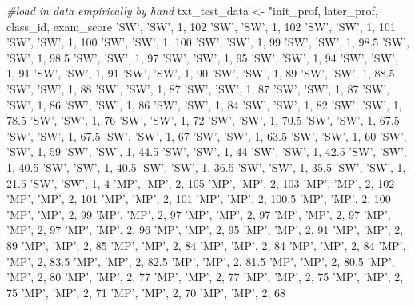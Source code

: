 \documentclass[
]{book}
\newenvironment{Shaded}{\begin{snugshade}}{\end{snugshade}}
\newcommand{\CommentTok}[1]{\textcolor[rgb]{0.56,0.35,0.01}{\textit{#1}}}
\newcommand{\NormalTok}[1]{#1}
\newcommand{\StringTok}[1]{\textcolor[rgb]{0.31,0.60,0.02}{#1}}
\begin{document}
\begin{Shaded}
\begin{Highlighting}[]
\CommentTok{#load in data empirically by hand}
\NormalTok{txt_test_data <-}\StringTok{ "init_prof, later_prof, class_id, exam_score}
\StringTok{ 'SW', 'SW', 1, 102}
\StringTok{ 'SW', 'SW', 1, 102}
\StringTok{ 'SW', 'SW', 1, 101}
\StringTok{ 'SW', 'SW', 1, 100}
\StringTok{ 'SW', 'SW', 1, 100}
\StringTok{ 'SW', 'SW', 1, 99}
\StringTok{ 'SW', 'SW', 1, 98.5}
\StringTok{ 'SW', 'SW', 1, 98.5}
\StringTok{ 'SW', 'SW', 1, 97}
\StringTok{ 'SW', 'SW', 1, 95}
\StringTok{ 'SW', 'SW', 1, 94}
\StringTok{ 'SW', 'SW', 1, 91}
\StringTok{ 'SW', 'SW', 1, 91}
\StringTok{ 'SW', 'SW', 1, 90}
\StringTok{ 'SW', 'SW', 1, 89}
\StringTok{ 'SW', 'SW', 1, 88.5}
\StringTok{ 'SW', 'SW', 1, 88}
\StringTok{ 'SW', 'SW', 1, 87}
\StringTok{ 'SW', 'SW', 1, 87}
\StringTok{ 'SW', 'SW', 1, 87}
\StringTok{ 'SW', 'SW', 1, 86}
\StringTok{ 'SW', 'SW', 1, 86}
\StringTok{ 'SW', 'SW', 1, 84}
\StringTok{ 'SW', 'SW', 1, 82}
\StringTok{ 'SW', 'SW', 1, 78.5}
\StringTok{ 'SW', 'SW', 1, 76}
\StringTok{ 'SW', 'SW', 1, 72}
\StringTok{ 'SW', 'SW', 1, 70.5}
\StringTok{ 'SW', 'SW', 1, 67.5}
\StringTok{ 'SW', 'SW', 1, 67.5}
\StringTok{ 'SW', 'SW', 1, 67}
\StringTok{ 'SW', 'SW', 1, 63.5}
\StringTok{ 'SW', 'SW', 1, 60}
\StringTok{ 'SW', 'SW', 1, 59}
\StringTok{ 'SW', 'SW', 1, 44.5}
\StringTok{ 'SW', 'SW', 1, 44}
\StringTok{ 'SW', 'SW', 1, 42.5}
\StringTok{ 'SW', 'SW', 1, 40.5}
\StringTok{ 'SW', 'SW', 1, 40.5}
\StringTok{ 'SW', 'SW', 1, 36.5}
\StringTok{ 'SW', 'SW', 1, 35.5}
\StringTok{ 'SW', 'SW', 1, 21.5}
\StringTok{ 'SW', 'SW', 1, 4}
\StringTok{ 'MP', 'MP', 2, 105}
\StringTok{ 'MP', 'MP', 2, 103}
\StringTok{ 'MP', 'MP', 2, 102}
\StringTok{ 'MP', 'MP', 2, 101}
\StringTok{ 'MP', 'MP', 2, 101}
\StringTok{ 'MP', 'MP', 2, 100.5}
\StringTok{ 'MP', 'MP', 2, 100}
\StringTok{ 'MP', 'MP', 2, 99}
\StringTok{ 'MP', 'MP', 2, 97}
\StringTok{ 'MP', 'MP', 2, 97}
\StringTok{ 'MP', 'MP', 2, 97}
\StringTok{ 'MP', 'MP', 2, 97}
\StringTok{ 'MP', 'MP', 2, 96}
\StringTok{ 'MP', 'MP', 2, 95}
\StringTok{ 'MP', 'MP', 2, 91}
\StringTok{ 'MP', 'MP', 2, 89}
\StringTok{ 'MP', 'MP', 2, 85}
\StringTok{ 'MP', 'MP', 2, 84}
\StringTok{ 'MP', 'MP', 2, 84}
\StringTok{ 'MP', 'MP', 2, 84}
\StringTok{ 'MP', 'MP', 2, 83.5}
\StringTok{ 'MP', 'MP', 2, 82.5}
\StringTok{ 'MP', 'MP', 2, 81.5}
\StringTok{ 'MP', 'MP', 2, 80.5}
\StringTok{ 'MP', 'MP', 2, 80}
\StringTok{ 'MP', 'MP', 2, 77}
\StringTok{ 'MP', 'MP', 2, 77}
\StringTok{ 'MP', 'MP', 2, 75}
\StringTok{ 'MP', 'MP', 2, 75}
\StringTok{ 'MP', 'MP', 2, 71}
\StringTok{ 'MP', 'MP', 2, 70}
\StringTok{ 'MP', 'MP', 2, 68}

\end{Highlighting}
\end{Shaded}
\end{document}
